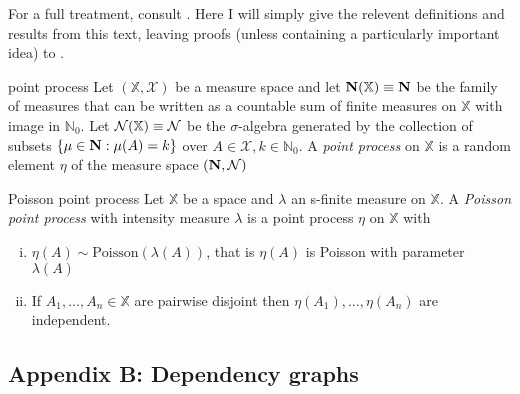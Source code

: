 \documentclass{article}
\begin{document}
For a full treatment, consult \cite{Last_Penrose_2017}. Here I will simply give the relevent definitions and 
results from this text, leaving proofs (unless containing a particularly important idea) to \cite{Last_Penrose_2017}.

\begin{definition}[]{point process}
    Let $(\mathbb{X}, \mathcal{X})$ be a measure space and let ${\bf N}(\mathbb{X}) \equiv {\bf N}$ be the family 
    of measures that can be written as a countable sum of finite measures on $\mathbb{X}$ with image in $\mathbb{N}_0$. 
    Let ${\bf \mathcal{N}}(\mathbb{X}) \equiv {\bf \mathcal{N}}$ be the $\sigma$-algebra generated by the collection 
    of subsets $\{\mu \in {\bf N} : \mu(A) = k\}$ over $A \in \mathcal{X}, k \in \mathbb{N}_0$. A {\it point process}
    on $\mathbb{X}$ is a random element $\eta$ of the measure space $({\bf N}, {\bf \mathcal{N}})$
\end{definition}

\begin{definition}[]{Poisson point process}
    Let $\mathbb{X}$ be a space and $\lambda$ an s-finite measure on $\mathbb{X}$. A {\it Poisson point process} 
    with intensity measure $\lambda$ is a point process $\eta$ on $\mathbb{X}$ with
    \begin{enumerate}[(i)]
        \item $\eta(A) \sim \text{Poisson}(\lambda(A))$, that is $\eta(A)$ is Poisson with parameter $\lambda(A)$
        \item If $A_1, \dots, A_n \in \mathbb{X}$ are pairwise disjoint then $\eta(A_1), \dots, \eta(A_n)$ 
        are independent.
    \end{enumerate}
\end{definition}

\newpage

\subsection{Appendix B: Dependency graphs}

\newpage


 
\end{document}
